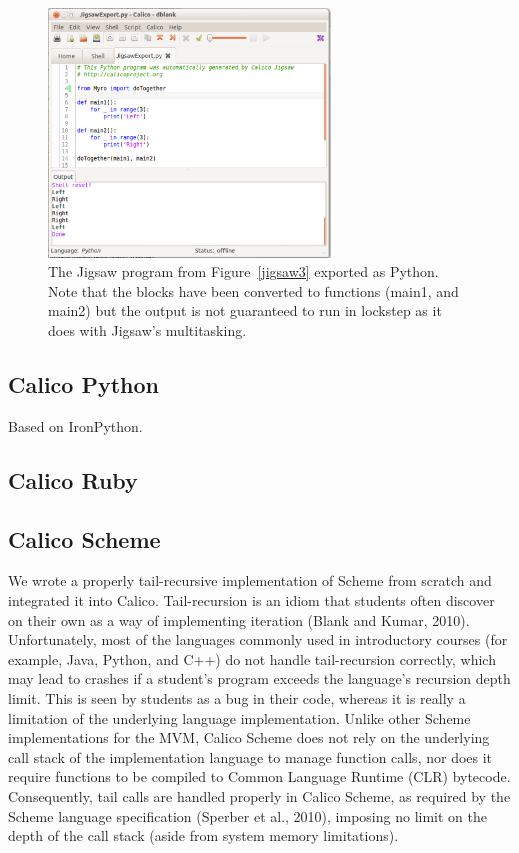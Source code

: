 \documentclass[preprint]{sigplanconf}
\begin{document}
\begin{figure}[h!]
  \centering
    \includegraphics[width=75mm]{jigsaw4.eps} 
  \caption{The Jigsaw program from Figure~\ref{jigsaw3} exported
    as Python. Note that the blocks have been converted to functions
    (main1, and main2) but the output is not guaranteed to run in
    lockstep as it does with Jigsaw's multitasking.}
  \label{jigsaw4}
\end{figure}

\subsection{Calico Python}

Based on IronPython. 

\subsection{Calico Ruby}

\subsection{Calico Scheme}

We wrote a properly tail-recursive implementation of Scheme from scratch and
integrated it into Calico.  Tail-recursion is an idiom that students often
discover on their own as a way of implementing iteration (Blank and Kumar,
2010). Unfortunately, most of the languages commonly used in introductory
courses (for example, Java, Python, and C++) do not handle tail-recursion
correctly, which may lead to crashes if a student's program exceeds the
language's recursion depth limit. This is seen by students as a bug in their
code, whereas it is really a limitation of the underlying language
implementation. Unlike other Scheme implementations for the MVM, Calico Scheme
does not rely on the underlying call stack of the implementation language to
manage function calls, nor does it require functions to be compiled to Common
Language Runtime (CLR) bytecode. Consequently, tail calls are handled properly
in Calico Scheme, as required by the Scheme language specification (Sperber et
al., 2010), imposing no limit on the depth of the call stack (aside from system
memory limitations).
\end{document}
